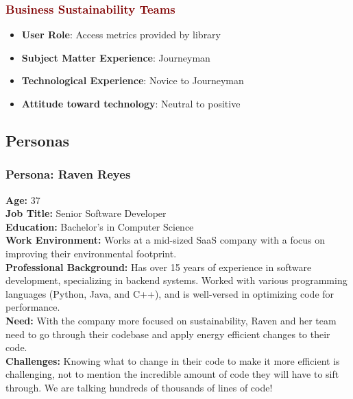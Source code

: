 \documentclass[12pt]{article}
\begin{document}
\subsubsection*{\textcolor{Maroon}{Business Sustainability Teams}}
\begin{itemize}
  \item \textbf{User Role}: Access metrics provided by library

  \item \textbf{Subject Matter Experience}: Journeyman

  \item \textbf{Technological Experience}: Novice to Journeyman
  
  \item \textbf{Attitude toward technology}: Neutral to positive

\end{itemize}

\subsection{Personas}

\subsubsection*{Persona: Raven Reyes}
\textbf{Age:} 37\\
\textbf{Job Title:} Senior Software Developer\\
\textbf{Education:} Bachelor's in Computer 
Science\\[2mm]
\textbf{Work Environment:} Works at a mid-sized SaaS company with a focus on improving their environmental footprint.\\
\textbf{Professional Background:} Has over 15 years of experience in software development, specializing in backend systems. Worked with various programming languages (Python, Java, and C++), and is well-versed in optimizing code for performance.\\[2mm]
\textbf{Need:} With the company more focused on sustainability, Raven and her team need to go through their codebase and apply energy efficient changes to their code.\\
\textbf{Challenges:} Knowing what to change in their code to make it more efficient is challenging, not to mention the incredible amount of code they will have to sift through. We are talking hundreds of thousands of lines of code!
\end{document}
